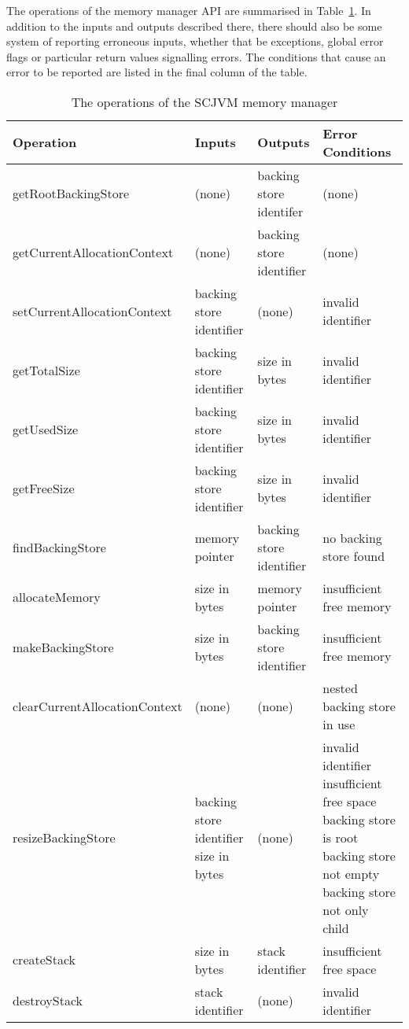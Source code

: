 \documentclass[a4paper,10pt]{report}
\begin{document}
The operations of the memory manager API are summarised in
Table~\ref{memory-manager-table}. In addition to the inputs and outputs
described there, there should also be some system of reporting erroneous inputs,
whether that be exceptions, global error flags or particular return values
signalling errors. The conditions that cause an error to be reported are listed
in the final column of the table.

\begin{table}[ht]
  \centering
  \footnotesize
  \begin{tabular}{|l|p{3cm}|p{3cm}|p{3.6cm}|}
    Operation & Inputs & Outputs & Error Conditions \\
    \hline
    getRootBackingStore &
      (none) &
      backing store identifer &
      (none)
    \\getCurrentAllocationContext &
      (none) &
      backing store identifier &
      (none)
    \\setCurrentAllocationContext &
      backing store identifier &
      (none) &
      invalid identifier
    \\getTotalSize &
      backing store identifier &
      size in bytes &
      invalid identifier
    \\getUsedSize &
      backing store identifier &
      size in bytes &
      invalid identifier
    \\getFreeSize &
      backing store identifier &
      size in bytes &
      invalid identifier
    \\findBackingStore &
      memory pointer &
      backing store identifier &
      no backing store found
    \\allocateMemory &
      size in bytes &
      memory pointer &
      insufficient free memory
    \\makeBackingStore &
      size in bytes & 
      backing store identifier &
      insufficient free memory
    \\clearCurrentAllocationContext &
      (none) &
      (none) &
      nested backing store in use
    \\resizeBackingStore &
      backing store identifier \newline
      size in bytes &
      (none) &
      invalid identifier \newline
      insufficient free space \newline
      backing store is root \newline
      backing store not empty \newline
      backing store not only child
    \\createStack &
      size in bytes &
      stack identifier &
      insufficient free space
    \\destroyStack &
      stack identifier &
      (none) &
      invalid identifier
  \end{tabular}
  \caption{The operations of the SCJVM memory manager}
  \label{memory-manager-table}
\end{table}
\end{document}
